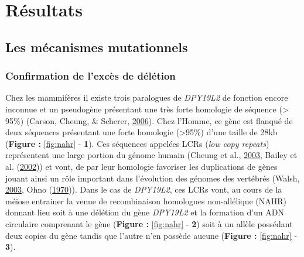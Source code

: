 \documentclass[12pt,twoside]{reedthesis}
\theoremstyle{definition}
\theoremstyle{definition}
\theoremstyle{remark}
\begin{document}
  \newpage
  
  \section{Résultats}\label{resultats}
  
  \hypertarget{mecamut}{\subsection{Les mécanismes
  mutationnels}\label{mecamut}}
  
  \subsubsection{Confirmation de l'excès de
  délétion}\label{confirmation-de-lexces-de-deletion}
  
  Chez les mammifères il existe trois paralogues de \emph{DPY19L2} de
  fonction encore inconnue et un pseudogène présentant une très forte
  homologie de séquence (\textgreater{} 95\%) (Carson, Cheung, \& Scherer,
  \protect\hyperlink{ref-Carson2006}{2006}). Chez l'Homme, ce gène est
  flanqué de deux séquences présentant une forte homologie
  (\textgreater{}95\%) d'une taille de 28kb (\textbf{Figure :
  }\ref{fig:nahr} - \textbf{1}). Ces séquences appelées LCRs (\emph{low
  copy repeats}) représentent une large portion du génome humain (Cheung
  et al., \protect\hyperlink{ref-Cheung2003}{2003}, Bailey et al.
  (\protect\hyperlink{ref-Bailey2002}{2002})) et vont, de par leur
  homologie favoriser les duplications de gènes jouant ainsi un rôle
  important dans l'évolution des génomes des vertébrés (Walsh,
  \protect\hyperlink{ref-Walsh2003}{2003}, Ohno
  (\protect\hyperlink{ref-Ohno1970}{1970})). Dans le cas de
  \emph{DPY19L2}, ces LCRs vont, au cours de la méiose entrainer la venue
  de recombinaison homologues non-allélique (NAHR) donnant lieu soit à une
  délétion du gène \emph{DPY19L2} et la formation d'un ADN circulaire
  comprenant le gène (\textbf{Figure : }\ref{fig:nahr} - \textbf{2}) soit
  à un allèle possédant deux copies du gène tandis que l'autre n'en
  possède aucune (\textbf{Figure : }\ref{fig:nahr} - \textbf{3}).
  
\end{document}
